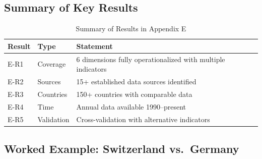 \subsection{Summary of Key Results}
\label{sec:E-results}

\begin{table}[htbp]
\centering
\caption{Summary of Results in Appendix E}
\label{tab:E-results}
\renewcommand{\arraystretch}{1.2}
\begin{tabular}{@{}llp{7cm}@{}}
\toprule
\textbf{Result} & \textbf{Type} & \textbf{Statement} \\
\midrule
E-R1 & Coverage & 6 dimensions fully operationalized with multiple indicators \\
E-R2 & Sources & 15+ established data sources identified \\
E-R3 & Countries & 150+ countries with comparable data \\
E-R4 & Time & Annual data available 1990--present \\
E-R5 & Validation & Cross-validation with alternative indicators \\
\bottomrule
\end{tabular}
\end{table}


\subsection{Worked Example: Switzerland vs.\ Germany}
\label{sec:E-example}


